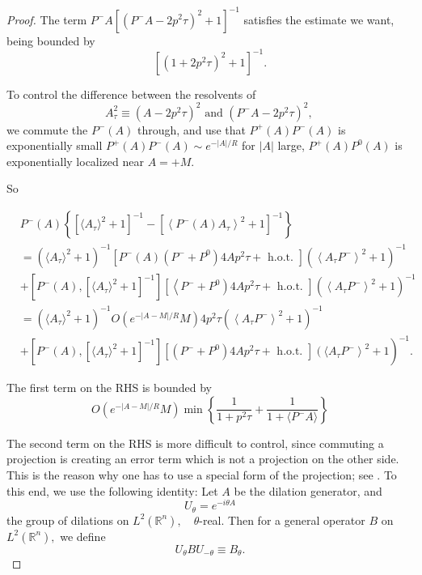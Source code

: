 \documentclass[11pt]{article}
\begin{document}
\begin{proof}
The term $P^{-}A\left[\left(P^{-} A-2 p^{2} \tau \right)^{2}+1\right]^{-1}$ satisfies the estimate we want, being bounded by
$$
\left[\left(1+2 p^{2} \tau\right)^{2}+1\right]^{-1} .
$$


To control the difference between the resolvents of
$$
A_{\tau}^2\equiv \left(A-2 p^{2} \tau\right)^{2} \text { and }\left(P^{-} A-2 p^{2} \tau\right)^{2} \text {, }
$$
we commute the $P^{-}(A)$ through, and use that
$P^{+}(A) P^{-}(A)$ is exponentially small $P^{+}(A) P^{-}(A) \sim e^{-|A| / R}$ for $|A|$ large,
$P^{+}(A) P^{0}(A)$ is exponentially localized near $A=+M$.

So

\begin{align}\label{Atau}
& P^{-}(A)\left\{\left[\langle A_{\tau}\rangle^{2}+1\right]^{-1}-\left[\left\langle P^{-}(A) A_{\tau}\right\rangle^{2}+1\right]^{-1}\right\} \\
& =\left(\langle A_{\tau}\rangle^{2}+1\right)^{-1}\left[P^{-}(A)\left(P^{-}+P^{0}\right) 4Ap^{2} \tau+\text { h.o.t. }\right]\left(\left\langle A_{\tau} P^{-}\right\rangle^{2}+1\right)^{-1} \\
& +\left[P^{-}(A),\left[\langle A_{\tau}\rangle^{2}+1\right]^{-1}\right]\left[\left\langle P^{-}+P^{0}\right) 4Ap^{2} \tau+\text { h.o.t. }\right]\left(\left\langle A_{\tau} P^{-}\right\rangle^{2}+1\right)^{-1} \\
& =\left(\langle A_{\tau}\rangle^{2}+1\right)^{-1} O\left(e^{-|A-M|/R} M\right) 4 p^{2} \tau\left(\left\langle A_{\tau} P^{-}\right\rangle^{2}+1\right)^{-1} \\
& \left.+\left[P^{-}(A),\left[\langle A_{\tau}\rangle^{2}+1\right]^{-1}\right]\left[\left(P^{-}+P^{0}\right) 4Ap^{2} \tau+\text { h.o.t. }\right]\left(\langle A_{\tau}P^{-}\right\rangle^{2}+1\right)^{-1} .
\end{align}


The first term on the RHS is bounded by
$$
O\left(e^{-|A -M| / R} M\right) \min\left\{\frac{1}{1+p^{2} \tau}+\frac{1}{1+\langle P^{-} A\rangle}\right\}
$$

The second term on the RHS is more difficult to control, since commuting a projection is creating an error term which is not a projection on the other side.
This is the reason why one has to use a special form of the projection; see \cite{soffer2011monotonic}. To this end, we use the following identity:
Let $A$ be the dilation generator, and
$$
U_{\theta}=e^{-i \theta A}
$$
the group of dilations on $L^{2}\left(\mathbb{R}^{n}\right),\quad \theta$-real.
Then for a general  operator $B$ on $L^{2}\left(\mathbb{R}^{n}\right),$  we define
$$
U_{\theta} B U_{-\theta} \equiv B_{\theta}.
$$


\end{proof}
\end{document}
